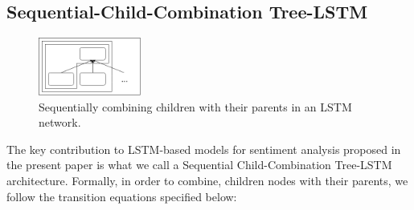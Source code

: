 \documentclass[10pt, a4paper]{article}
\begin{document}
\subsection{Sequential-Child-Combination Tree-LSTM}

\begin{figure}[h]
	 \begin{center}
    	\includegraphics[width=0.3\textwidth]{imgs/sequentialchild}
		\caption{Sequentially combining children with their parents in an LSTM network.}
		\label{tab:sequentialchild}
	 \end{center}
\end{figure}
	The key contribution to LSTM-based models for sentiment analysis proposed in the present paper is what we call a Sequential Child-Combination Tree-LSTM architecture. Formally, in order to combine, children nodes with their parents, we follow the transition equations specified below:
\end{document}
